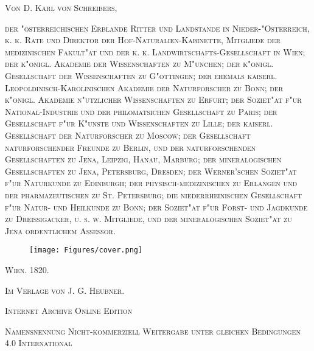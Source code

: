 \documentclass[a4paper, 11pt, oneside, german]{article}
\begin{document}
\begin{titlepage}
	\vspace{1\baselineskip} %
	
	
	{\scshape Von D. Karl von Schreibers,} %
	
	\vspace*{1\baselineskip} %
	
        {\scshape\footnotesize der "osterreichischen Erblande Ritter und Landstande in Nieder-"Osterreich, k. k. Rate und Direktor der Hof-Naturalien-Kabinette, Mitgliede der medizinischen Fakult"at und der k. k. Landwirtschafts-Gesellschaft in Wien; der k"onigl. Akademie der Wissenschaften zu M"unchen; der k"onigl. Gesellschaft der Wissenschaften zu G"ottingen; der ehemals kaiserl. Leopoldinisch-Karolinischen Akademie der Naturforscher zu Bonn; der k"onigl. Akademie n"utzlicher Wissenschaften zu Erfurt; der Soziet"at f"ur National-Industrie und der philomatsichen Gesellschaft zu Paris; der Gesellschaft f"ur K"unste und Wissenschaften zu Lille; der kaiserl. Gesellschaft der Naturforscher zu Moscow; der Gesellschaft naturforschender Freunde zu Berlin, und der naturforschenden Gesellschaften zu Jena, Leipzig, Hanau, Marburg; der mineralogischen Gesellschaften zu Jena, Petersburg, Dresden; der Werner'schen Soziet"at f"ur Naturkunde zu Edinburgh; der physisch-medizinischen zu Erlangen und der pharmazeutischen zu St. Petersburg; die niederrheinischen Gesellschaft f"ur Natur- und Heilkunde zu Bonn; der Soziet"at f"ur Forst- und Jagdkunde zu Dreissigacker, u. s. w. Mitgliede, und der mineralogischen Soziet"at zu Jena ordentlichem Assessor.} %

        \begin{figure}[h!]
            \centering
            \texttt{[image: Figures/cover.png]}
        \end{figure}
        
        \vspace*{\fill}

	{\scshape Wien. 1820.}
	
	{\scshape{Im Verlage von J. G. Heubner.}}
	
	\vspace{0.5\baselineskip} %

    \scshape Internet Archive Online Edition  %
	
	{\scshape Namensnennung Nicht-kommerziell Weitergabe unter gleichen Bedingungen 4.0 International} %
\end{titlepage}
\end{document}
